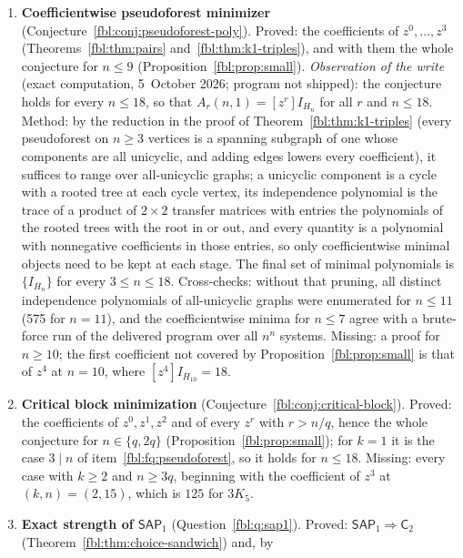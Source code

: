 \documentclass[11pt]{article}
\theoremstyle{definition}
\theoremstyle{remark}
\newcommand{\SAP}{\mathsf{SAP}}
\newcommand{\Cm}{\mathsf{C}}
\begin{document}
\begin{enumerate}[leftmargin=*,label=\textbf{\arabic*.},ref=\arabic*]
\item\label{fbl:fq:pseudoforest} \textbf{Coefficientwise pseudoforest
 minimizer} (Conjecture~\ref{fbl:conj:pseudoforest-poly}). Proved: the
 coefficients of $z^0,\dots,z^3$ (Theorems~\ref{fbl:thm:pairs}
 and~\ref{fbl:thm:k1-triples}), and with them the whole conjecture for
 $n\le9$ (Proposition~\ref{fbl:prop:small}). \emph{Observation of the
 write} (exact computation, 5~October 2026; program not shipped): the
 conjecture holds for every $n\le18$, so that $A_r(n,1)=[z^r]I_{H_n}$ for
 all $r$ and $n\le18$. Method: by the reduction in the proof of
 Theorem~\ref{fbl:thm:k1-triples} (every pseudoforest on $n\ge3$ vertices
 is a spanning subgraph of one whose components are all unicyclic, and
 adding edges lowers every coefficient), it suffices to range over
 all-unicyclic graphs; a unicyclic component is a cycle with a rooted tree
 at each cycle vertex, its independence polynomial is the trace of a
 product of $2\times2$ transfer matrices with entries the polynomials of the
 rooted trees with the root in or out, and every quantity is a polynomial
 with nonnegative coefficients in those entries, so only coefficientwise
 minimal objects need to be kept at each stage. The final set of minimal
 polynomials is $\{I_{H_n}\}$ for every $3\le n\le18$. Cross-checks: without
 that pruning, all distinct independence polynomials of all-unicyclic
 graphs were enumerated for $n\le11$ (575 for $n=11$), and the coefficientwise
 minima for $n\le7$ agree with a brute-force run of the delivered program
 over all $n^n$ systems. Missing: a proof for $n\ge10$; the first coefficient
 not covered by Proposition~\ref{fbl:prop:small} is that of $z^4$ at
 $n=10$, where $[z^4]I_{H_{10}}=18$.
\item\label{fbl:fq:critical-block} \textbf{Critical block minimization}
 (Conjecture~\ref{fbl:conj:critical-block}). Proved: the coefficients of
 $z^0,z^1,z^2$ and of every $z^r$ with $r>n/q$, hence the whole conjecture
 for $n\in\{q,2q\}$ (Proposition~\ref{fbl:prop:small}); for $k=1$ it is
 the case $3\mid n$ of item~\ref{fbl:fq:pseudoforest}, so it holds for
 $n\le18$. Missing: every case with $k\ge2$ and $n\ge3q$, beginning with
 the coefficient of $z^3$ at $(k,n)=(2,15)$, which is $125$ for $3K_5$.
\item\label{fbl:fq:sap1} \textbf{Exact strength of $\SAP_1$}
 (Question~\ref{fbl:q:sap1}). Proved: $\SAP_1\Rightarrow\Cm_2$
 (Theorem~\ref{fbl:thm:choice-sandwich}) and, by

\end{enumerate}
\end{document}
